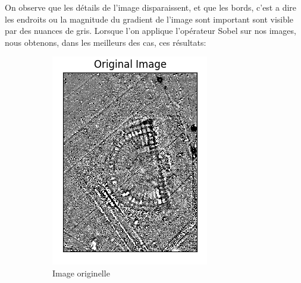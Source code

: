 \documentclass[a4paper, 12pt, titlepage, oneside, french]{article}
\begin{document}
	On observe que les détails de l'image disparaissent, et que les bords, c'est a dire les endroits ou la magnitude du gradient de l'image sont important sont visible par des nuances de gris.
	\newpage
	Lorsque l'on applique l'opérateur Sobel sur nos images, nous obtenons, dans les meilleurs des cas, ces résultats:
	\begin{figure}[H]
		\centering
		\begin{subfigure}[]{0.4\linewidth}
			\includegraphics[width=\linewidth]{Sobel1b.png}
			\caption{Image originelle}
		\end{subfigure}
		\begin{subfigure}[]{0.4\linewidth}

\end{subfigure}
\end{figure}
\end{document}
